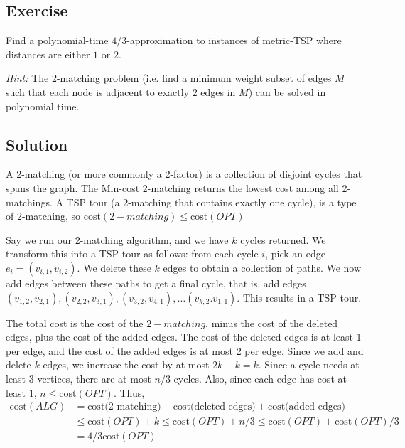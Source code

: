 \documentclass{article}
\newcounter{counter}
\newcommand{\Exercise}{Exercise \stepcounter{counter}\thecounter}
\begin{document}
\subsection*{\Exercise}
    Find a polynomial-time $4/3$-approximation to instances of metric-TSP where distances are either $1$ or $2$.

    \vspace{3mm}
    \textit{Hint:} The 2-matching problem (i.e. find a minimum weight subset of edges $M$ such that each node is adjacent to exactly $2$ edges in $M$) can be solved in polynomial time.
    
\subsection*{Solution}
    A 2-matching (or more commonly a 2-factor) is a collection of disjoint cycles that spans the graph. The Min-cost 2-matching returns the lowest cost among all 2-matchings. A TSP tour (a 2-matching that contains exactly one cycle), is a type of 2-matching, so $\text{cost}(2-matching)\leq \text{cost}(OPT)$

    \vspace{3mm}
    Say we run our 2-matching algorithm, and we have $k$ cycles returned. We transform this into a TSP tour as follows: from each cycle $i$, pick an edge $e_i = (v_{i,1}, v_{i,2})$. We delete these $k$ edges to obtain a collection of paths. We now add edges between these paths to get a final cycle, that is, add edges $(v_{1,2}, v_{2,1}), (v_{2,2}, v_{3,1}), (v_{3,2}, v_{4,1}), \ldots (v_{k,2}. v_{1,1})$. This results in a TSP tour.

    \vspace{3mm}
    The total cost is the cost of the $2-matching$, minus the cost of the deleted edges, plus the cost of the added edges. The cost of the deleted edges is at least 1 per edge, and the cost of the added edges is at most 2 per edge. Since we add and delete $k$ edges, we increase the cost by at most $2k -k = k$. Since a cycle needs at least $3$ vertices, there are at most $n/3$ cycles. Also, since each edge has cost at least $1$, $n \leq \text{cost}(OPT)$. Thus,
    $$\begin{aligned}
        \text{cost}(ALG) &= \text{cost(2-matching)} - \text{cost(deleted\ edges)} + \text{cost(added\ edges)} \\
        &\leq \text{cost}(OPT) + k \leq \text{cost}(OPT) + n/3 \leq \text{cost}(OPT) + \text{cost}(OPT)/3 \\
        &= 4/3 \text{cost}(OPT)
    \end{aligned}$$
\end{document}
